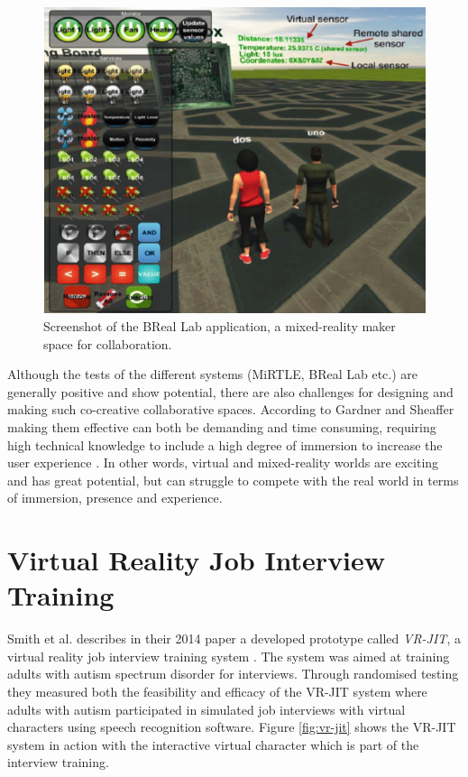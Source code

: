\begin{figure}[!ht]
     \centering
     \includegraphics[width=.7\textwidth]{./fig/related_work/BReal.PNG}
     \captionsetup{width=0.6\linewidth}
     \caption{Screenshot of the BReal Lab application, a mixed-reality maker space for collaboration.}
     \label{fig:BReal}
 \end{figure}
 
 
 Although the tests of the different systems (MiRTLE, BReal Lab etc.) are generally positive and show  potential, there are also challenges for designing and making such co-creative collaborative spaces. According to Gardner and Sheaffer making them effective can both be demanding and time consuming, requiring high technical knowledge to include a high degree of immersion to increase the user experience \cite{gardner2017systems}. In other words, virtual and mixed-reality worlds are exciting and has great potential, but can struggle to compete with the real world in terms of immersion, presence and experience.          


\section{Virtual Reality Job Interview Training}
Smith et al. describes in their 2014 paper a developed prototype called \textit{VR-JIT}, a virtual reality job interview training system \cite{smith2014virtual}. The system was aimed at training adults with autism spectrum disorder for interviews. Through randomised testing they measured both the feasibility and efficacy of the VR-JIT system where adults with autism participated in simulated job interviews with virtual characters using speech recognition software. Figure \ref{fig:vr-jit} shows the VR-JIT system in action with the interactive virtual character which is part of the interview training.   


